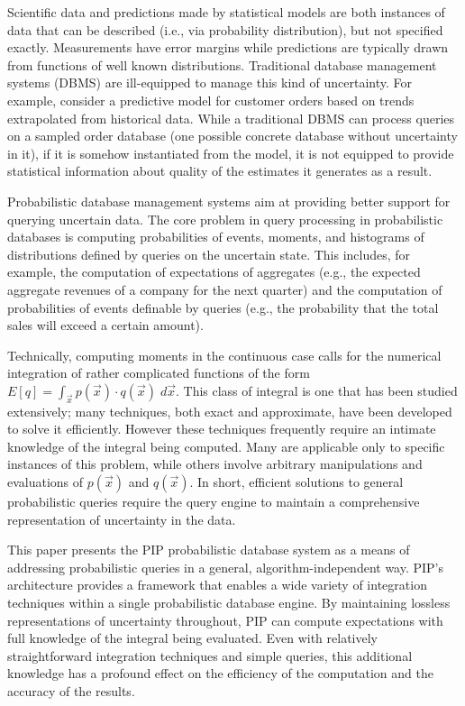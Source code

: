 Scientific data and predictions made by statistical models are both instances of data that can be described (i.e., via probability distribution), but not specified exactly.  Measurements have error margins while predictions are typically drawn from functions of well known distributions.  Traditional database management systems (DBMS) are ill-equipped to manage this kind of uncertainty.  For  example, consider  a predictive model  for customer orders based  on trends extrapolated  from historical data.   While a traditional  DBMS can process  queries on  a sampled  order data\-base (one possible  concrete database without  uncertainty in it), if  it is somehow instantiated  from the  model, it is  not equipped  to provide statistical information about quality of the estimates it generates as a result.

Probabilistic  database  management  systems \cite{dalvi07efficient, WidomTrio2008, KochMayBMS2008, SD2007, ORION, MCDB, BayesStore} aim at providing better support for querying uncertain data.  The core problem in query processing in probabilistic databases is computing probabilities of events, moments, and histograms of distributions defined by queries on the uncertain state.  This includes, for example, the computation of expectations of aggregates (e.g., the expected aggregate revenues of a company for the next quarter) and the computation of probabilities of events definable by queries (e.g., the probability that the total sales will exceed a certain amount).

Technically, computing moments in the continuous case calls for the numerical integration of rather complicated functions of the form $E[q] = \int_{\vec x} p(\vec{x}) \cdot q(\vec{x}) \; d\vec{x}.$
This class of integral is one that has been studied extensively; many techniques, both exact and approximate, have been developed to solve it efficiently.  However these techniques frequently require an intimate knowledge of the integral being computed.  Many are applicable only to specific instances of this problem, while others involve arbitrary manipulations and evaluations of $p(\vec x)$ and $q(\vec x)$.  In short, efficient solutions to general probabilistic queries require the query engine to maintain a comprehensive representation of uncertainty in the data.

This paper presents the PIP probabilistic database system as a means of addressing probabilistic queries in a general, algorithm-independent way.  PIP's architecture provides a framework that enables a wide variety of integration techniques within a single probabilistic database engine.  By maintaining lossless representations of uncertainty throughout, PIP can compute expectations with full knowledge of the integral being evaluated.  Even with relatively straightforward integration techniques and simple queries, this additional knowledge has a profound effect on the efficiency of the computation and the accuracy of the results.


